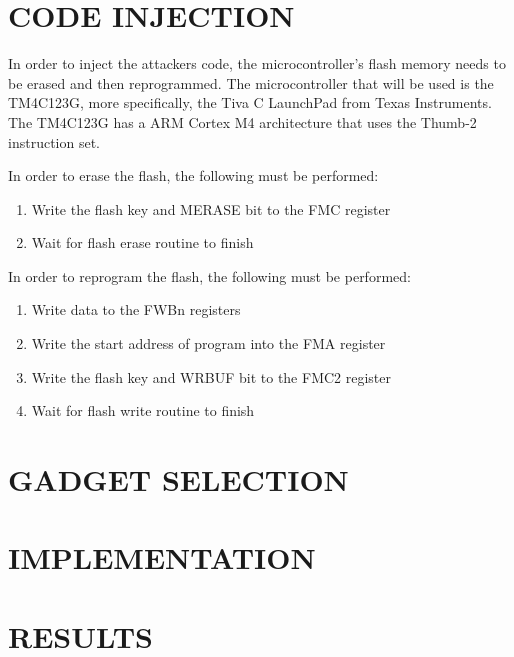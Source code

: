 \documentclass[letterpaper, 10 pt, conference]{ieeeconf}  %
\begin{document}
\section{CODE INJECTION}

In order to inject the attackers code, the microcontroller's flash memory needs to be erased and then reprogrammed.  The microcontroller that will be used is the TM4C123G, more specifically, the Tiva C LaunchPad from Texas Instruments.  The TM4C123G has a ARM Cortex M4 architecture that uses the Thumb-2 instruction set.

In order to erase the flash, the following must be performed:

\begin{enumerate}
\item Write the flash key and MERASE bit to the FMC register
\item Wait for flash erase routine to finish
\end{enumerate}

In order to reprogram the flash, the following must be performed:

\begin{enumerate}
\item Write data to the FWBn registers
\item Write the start address of program into the FMA register
\item Write the flash key and WRBUF bit to the FMC2 register
\item Wait for flash write routine to finish
\end{enumerate}

\section{GADGET SELECTION}

\section{IMPLEMENTATION}


\section{RESULTS}
\end{document}
